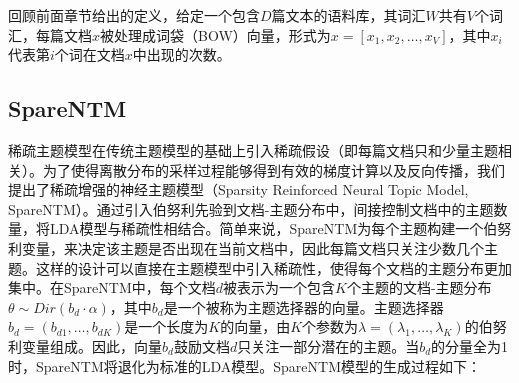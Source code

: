 回顾前面章节给出的定义，给定一个包含$D$篇文本的语料库，其词汇$W$共有$V$个词汇，每篇文档$x$被处理成词袋（BOW）向量，形式为$x=[x_1,x_2,\dots,x_V]$，其中$x_i$代表第$i$个词在文档$x$中出现的次数。



\subsection{SpareNTM}
稀疏主题模型在传统主题模型的基础上引入稀疏假设（即每篇文档只和少量主题相关）。为了使得离散分布的采样过程能够得到有效的梯度计算以及反向传播，我们提出了稀疏增强的神经主题模型（Sparsity Reinforced Neural Topic Model, SpareNTM）。通过引入伯努利先验到文档-主题分布中，间接控制文档中的主题数量，将LDA模型与稀疏性相结合。简单来说，SpareNTM为每个主题构建一个伯努利变量，来决定该主题是否出现在当前文档中，因此每篇文档只关注少数几个主题。这样的设计可以直接在主题模型中引入稀疏性，使得每个文档的主题分布更加集中。在SpareNTM中，每个文档$d$被表示为一个包含$K$个主题的文档-主题分布$\theta\sim Dir(b_d\cdot\alpha)$，其中$b_d$是一个被称为主题选择器的向量。主题选择器$b_d=(b_{d1},…,b_{dK})$是一个长度为$K$的向量，由$K$个参数为$\lambda=(\lambda_1,\dots,\lambda_K)$的伯努利变量组成。因此，向量$b_d$鼓励文档$d$只关注一部分潜在的主题。当$b_d$的分量全为1时，SpareNTM将退化为标准的LDA模型。SpareNTM模型的生成过程如下：


